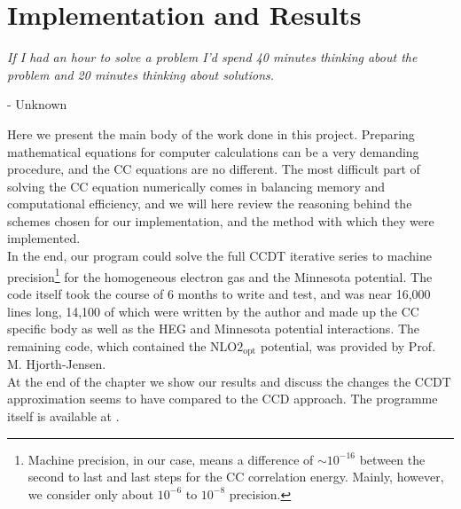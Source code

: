 \documentclass[10pt,twoside]{report}
\begin{document}
	\chapter{Implementation and Results}
	\epigraph{\textit{If I had an hour to solve a problem I'd spend 40 minutes thinking about the problem and 20 minutes thinking about solutions.}}{- Unknown \cite{Quote}}
	Here we present the main body of the work done in this project. Preparing mathematical equations for computer calculations can be a very demanding procedure, and the CC equations are no different. The most difficult part of solving the CC equation numerically comes in balancing memory and computational efficiency, and we will here review the reasoning behind the schemes chosen for our implementation, and the method with which they were implemented.\\
	
	In the end, our program could solve the full CCDT iterative series to machine precision\footnote{Machine precision, in our case, means a difference of $\sim10^{-16}$ between the second to last and last steps for the CC correlation energy. Mainly, however, we consider only about $10^{-6}$ to $10^{-8}$ precision.} for the homogeneous electron gas and the Minnesota potential. The code itself took the course of 6 months to write and test, and was near 16,000 lines long, 14,100 of which were written by the author and made up the CC specific body as well as the HEG and Minnesota potential interactions. The remaining code, which contained the $\text{NLO2}_{\text{opt}}$ potential, was provided by Prof. M. Hjorth-Jensen.\\
	
	At the end of the chapter we show our results and discuss the changes the CCDT approximation seems to have compared to the CCD approach. The programme itself is available at \cite{meg}.
	
\end{document}
